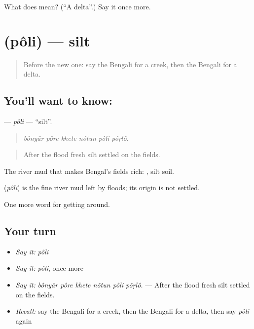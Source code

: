 \begin{tcolorbox}[breakable,colback=teal!4,colframe=teal!35!black,title={Before you move on}]
What does  mean? (\textquotedblleft{}A delta\textquotedblright{}.) Say it once more.
\end{tcolorbox}
\section[\texorpdfstring{\bn{পলি} (pôli)}{পলি (pôli)}]{ (pôli) — silt}

\label{lesson:BN-C431-poli}



\begin{quote}
Before the new one: say the Bengali for a creek, then the Bengali for a delta.
\end{quote}

\subsection*{You'll want to know: }
\textbf{} — \emph{pôli} — \textquotedblleft{}silt\textquotedblright{}.

\begin{quote}
     
\end{quote}

\begin{quote}
\emph{bônyār pôre khete nôtun pôli pôṛlô.}
\end{quote}

\begin{quote}
After the flood fresh silt settled on the fields.
\end{quote}

The river mud that makes Bengal's fields rich: , silt soil.

\begin{cousinweb}
\textbf{} (\emph{pôli}) is the fine river mud left by floods; its origin is not settled.
\end{cousinweb}

\begin{grammarlens}[title={What you've built}]
One more word for getting around.
\end{grammarlens}

\subsection*{Your turn}
\begin{itemize}
\raggedright
  \item \emph{Say it:} \emph{pôli}
  \item \emph{Say it:} \emph{pôli}, once more
  \item \emph{Say it:} \emph{bônyār pôre khete nôtun pôli pôṛlô.} — After the flood fresh silt settled on the fields.
  \item \emph{Recall:} say the Bengali for a creek, then the Bengali for a delta, then say \emph{pôli} again
\end{itemize}

